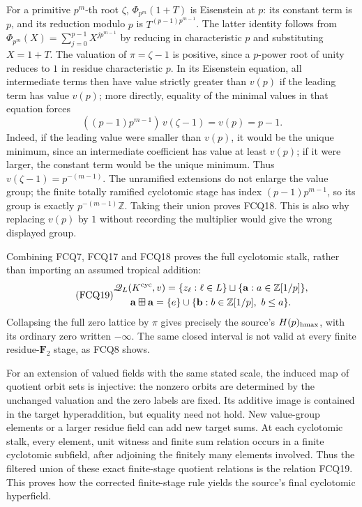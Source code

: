 For a primitive $p^m$-th root $\zeta$,
$\Phi_{p^m}(1+T)$ is Eisenstein at $p$: its constant
term is $p$, and its reduction modulo $p$ is
$T^{(p-1)p^{m-1}}$. The latter identity follows from
$\Phi_{p^m}(X)=\sum_{j=0}^{p-1}X^{jp^{m-1}}$
by reducing in characteristic $p$ and substituting
$X=1+T$. The valuation of $\pi=\zeta-1$ is positive,
since a $p$-power root of unity reduces to $1$ in
residue characteristic $p$. In its Eisenstein equation,
all intermediate terms then have value strictly greater
than $v(p)$ if the leading term has value $v(p)$;
more directly, equality of the minimal values in that
equation forces
\[
((p-1)p^{m-1})\,v(\zeta-1)=v(p)=p-1.
\]
Indeed, if the leading value were smaller than $v(p)$,
it would be the unique minimum, since an intermediate
coefficient has value at least $v(p)$; if it were larger,
the constant term would be the unique minimum.
Thus $v(\zeta-1)=p^{-(m-1)}$.
The unramified extensions do not enlarge the value group;
the finite totally ramified cyclotomic stage has index
$(p-1)p^{m-1}$, so its group is exactly
$p^{-(m-1)}\mathbb Z$. Taking their union proves FCQ18.
This is also why replacing $v(p)$ by $1$ without recording
the multiplier would give the wrong displayed group.

Combining FCQ7, FCQ17 and FCQ18 proves the full cyclotomic
stalk, rather than importing an assumed tropical addition:
\begin{equation}\tag{FCQ19}
\begin{gathered}
\mathscr Q_L(K^{\rm cyc},v)
 =\{z_\ell:\ell\in L\}
       \sqcup\{\mathbf a:a\in\mathbb Z[1/p]\},\\
\mathbf a\boxplus\mathbf a
 =\{e\}\cup\{\mathbf b:b\in\mathbb Z[1/p],\ b\le a\}.
\end{gathered}
\end{equation}
Collapsing the full zero lattice by $\pi$ gives precisely
the source's $H(p)_{\rm hmax}$, with its ordinary zero
written $-\infty$. The same closed interval is not valid
at every finite residue-$\mathbf F_2$ stage, as FCQ8 shows.

For an extension of valued fields with the same stated scale,
the induced map of quotient orbit sets is injective:
the nonzero orbits are determined by the unchanged valuation
and the zero labels are fixed. Its additive image is contained
in the target hyperaddition, but equality need not hold.
New value-group elements or a larger residue field can add
new target sums. At each cyclotomic stalk, every element,
unit witness and finite sum relation occurs in a finite
cyclotomic subfield, after adjoining the finitely many
elements involved. Thus the filtered union of these exact
finite-stage quotient relations is the relation FCQ19.
This proves how the corrected finite-stage rule yields the
source's final cyclotomic hyperfield.

